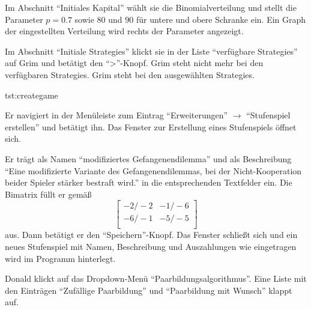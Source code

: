 \documentclass[parskip=full,11pt]{scrartcl}
\begin{document}
{Im Abschnitt \enquote{Initiales \Gls{Kapital}} wählt sie die Binomialverteilung und stellt die Parameter \(p = 0.7\) sowie \(80\) und \(90\) für untere und obere Schranke ein.}
{Ein Graph der eingestellten Verteilung wird rechts der Parameter angezeigt.}

{Im Abschnitt \enquote{Initiale \Glspl{Strategie}} klickt sie in der Liste \enquote{verfügbare \Glspl{Strategie}} auf Grim und betätigt den \enquote{>}-Knopf.}
{Grim steht nicht mehr bei den verfügbaren \Glspl{Strategie}. Grim steht bei den ausgewählten \Glspl{Strategie}.}

{tst:creategame}

{Er navigiert in der Menüleiste zum Eintrag \enquote{Erweiterungen} \(\rightarrow\) \enquote{\Gls{Stufenspiel} erstellen} und betätigt ihn.}
{Das Fenster zur Erstellung eines \Gls{Stufenspiel}s öffnet sich.}

{Er trägt als Namen \enquote{modifiziertes Gefangenendilemma} und als Beschreibung \enquote{Eine modifizierte Variante des Gefangenendilemmas, bei der Nicht-Kooperation beider Spieler stärker bestraft wird.} in die entsprechenden Textfelder ein. Die \Gls{Bimatrix} füllt er gemäß
\[
\left[ \begin{array}{rr}
-2 / -2 & -1 / -6 \\
-6 / -1 & -5 / -5 \\
\end{array}\right]
\]
aus. Dann betätigt er den \enquote{Speichern}-Knopf.}
{Das Fenster schließt sich und ein neues \Gls{Stufenspiel} mit Namen, Beschreibung und Auszahlungen wie eingetragen wird im Programm hinterlegt.}


{Donald klickt auf das Dropdown-Menü \enquote{Paarbildungsalgorithmus}.}
{Eine Liste mit den Einträgen \enquote{Zufällige Paarbildung} und \enquote{Paarbildung mit Wunsch} klappt auf.}
\end{document}
